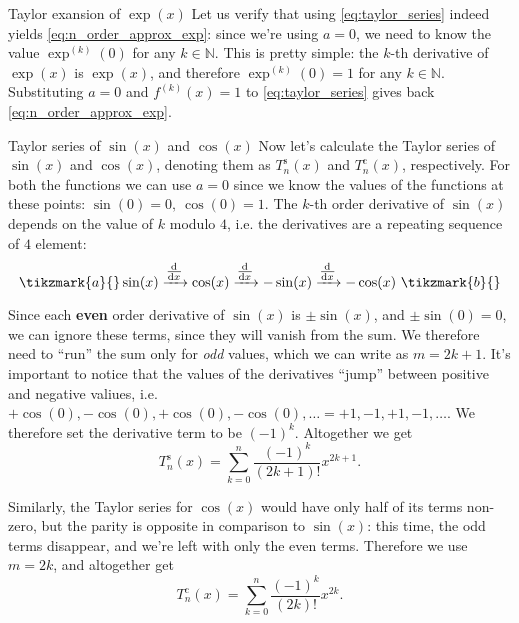 \begin{example}{Taylor exansion of $\exp(x)$}{}
  Let us verify that using \autoref{eq:taylor_series} indeed yields \autoref{eq:n_order_approx_exp}: since we're using $a=0$, we need to know the value $\exp^{(k)}(0)$ for any $k\in\mathbb{N}$. This is pretty simple: the $k$-th derivative of $\exp(x)$ is $\exp(x)$, and therefore $\exp^{(k)}(0)=1$ for any $k\in\mathbb{N}$. Substituting $a=0$ and $f^{(k)}(x)=1$ to \autoref{eq:taylor_series} gives back \autoref{eq:n_order_approx_exp}.
\end{example}

\begin{example}{Taylor series of $\sin(x)$ and $\cos(x)$}{}
  Now let's calculate the Taylor series of $\sin(x)$ and $\cos(x)$, denoting them as $T^{\text{s}}_{n}(x)$ and $T^{\text{c}}_{n}(x)$, respectively. For both the functions we can use $a=0$ since we know the values of the functions at these points: $\sin(0)=0,\ \cos(0)=1$. The $k$-th order derivative of $\sin(x)$ depends on the value of $k$ modulo $4$, i.e. the derivatives are a repeating sequence of $4$ element:
  \[
    \tikzmark{a}{}\sin(x) \xrightarrow[]{\od{}{x}} \cos(x) \xrightarrow[]{\od{}{x}} -\sin(x) \xrightarrow[]{\od{}{x}} -\cos(x)\ \tikzmark{b}{}
  \]

  \vspace{1em}
  Since each \textbf{even} order derivative of $\sin(x)$ is $\pm\sin(x)$, and $\pm\sin(0)=0$, we can ignore these terms, since they will vanish from the sum. We therefore need to ``run'' the sum only for \emph{odd} values, which we can write as $m=2k+1$. It's important to notice that the values of the derivatives ``jump'' between positive and negative valiues, i.e. $+\cos(0),-\cos(0),+\cos(0),-\cos(0),\dots = +1,-1,+1,-1,\dots$. We therefore set the derivative term to be $(-1)^{k}$. Altogether we get
  \[
    T^{\text{s}}_{n}(x) = \sum\limits_{k=0}^{n}\frac{(-1)^{k}}{(2k+1)!}x^{2k+1}.
  \]

  Similarly, the Taylor series for $\cos(x)$ would have only half of its terms non-zero, but the parity is opposite in comparison to $\sin(x)$: this time, the odd terms disappear, and we're left with only the even terms. Therefore we use $m=2k$, and altogether get
  \[
    T^{\text{c}}_{n}(x) = \sum\limits_{k=0}^{n}\frac{(-1)^{k}}{(2k)!}x^{2k}.
  \]
\end{example}

